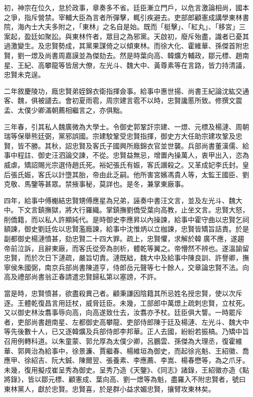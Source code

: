 \begin{pinyinscope}
初，神宗在位久，怠於政事，章奏多不省。廷臣漸立門戶，以危言激論相尚，國本之爭，指斥營禁。宰輔大臣為言者所彈擊，輒引疾避去。吏部郎顧憲成講學東林書院，海內士大夫多附之，「東林」之名自是始。既而「梃擊」、「紅丸」、「移宮」三案起，盈廷如聚訟。與東林忤者，眾目之為邪黨。天啟初，廢斥殆盡，識者已憂其過激變生。及忠賢勢成，其黨果謀倚之以傾東林。而徐大化、霍維華、孫傑首附忠賢，劉一燝及尚書周嘉謨並為傑劾去。然是時葉向高、韓爌方輔政，鄒元標、趙南星、王紀、高攀龍等皆居大僚，左光斗、魏大中、黃尊素等在言路，皆力持清議，忠賢未克逞。

二年敘慶陵功，廕忠賢弟姪錦衣衛指揮僉事。給事中惠世揚、尚書王紀論沈紘交通客、魏，俱被譴去。會初夏雨雹，周宗建言雹不以時，忠賢讒慝所致。修撰文震孟、太僕少卿滿朝薦相繼言之，亦俱黜。

三年春，引其私人魏廣微為大學士。令御史郭鞏訐宗建、一燝、元標及楊漣、周朝瑞等保舉熊廷弼，黨邪誤國。宗建駮鞏受忠賢指揮，御史方大任助宗建攻鞏及忠賢，皆不勝。其秋，詔忠賢及客氏子國興所廕錦衣官並世襲。兵部尚書董漢儒、給事中程註、御史汪泗論交諫，不從。忠賢益無忌，增置內操萬人，衷甲出入，恣為威虐。矯詔賜光宗選侍趙氏死。裕妃張氏有娠，客氏譖殺之。又革成妃李氏封。皇后張氏娠，客氏以計墮其胎，帝由此乏嗣。他所害宮嬪馮貴人等，太監王國臣、劉克敬、馬鑒等甚眾。禁掖事秘，莫詳也。是冬，兼掌東廠事。

四年，給事中傅櫆結忠賢甥傅應星為兄弟，誣奏中書汪文言，並及左光斗、魏大中。下文言鎮撫獄，將大行羅織。掌鎮撫劉僑受葉向高教，止坐文言。忠賢大怒，削僑籍，而以私人許顯純代。是時御史李應昇以內操諫，給事中霍守曲以忠賢乞祠額諫，御史劉廷佐以忠賢濫廕諫，給事中沈惟炳以立枷諫，忠賢皆矯旨詰責。於是副都御史楊漣憤甚，劾忠賢二十四大罪。疏上，忠賢懼，求解於韓廣不應，遂趨帝前泣訴，且辭東廠，而客氏從旁為剖析，體乾等翼之。帝懵然不辨也。遂溫諭留忠賢，而於次日下漣疏，嚴旨切責。漣既絀，魏大中及給事中陳良訓、許譽卿，撫寧侯朱國弼，南京兵部尚書陳道亨，侍郎岳元聲等七十餘人，交章論忠賢不法。向高及禮部尚書翁正春請遣忠賢歸私第以塞謗，不許。

當是時，忠賢憤甚，欲盡殺異己者。顧秉謙因陰籍其所忌姓名授忠賢，使以次斥逐。王體乾復昌言用廷杖，威脅廷臣。未幾，工部郎中萬燝上疏刺忠賢，立杖死。又以御史林汝翥事辱向高，向高遂致仕去，汝翥亦予杖。廷臣俱大讋。一時罷斥者，吏部尚書趙南星、左都御史高攀龍、吏部侍郎陳于廷及楊漣、左光斗、魏大中等先後數十人，已又逐韓爌及兵部侍郎李邦華。正人去國，紛紛若振槁。乃矯中旨召用例轉科道。以朱童蒙、郭允厚為太僕少卿，呂鵬雲、孫傑為大理丞，復霍維華、郭興治為給事中，徐景濂、賈繼春、楊維垣為御史，而起徐兆魁、王紹徽、喬應甲、徐紹吉、阮大鋮、陳爾翌、張養素、李應薦、李嵩、楊春懋等，為之爪牙。未幾，復用擬戍崔呈秀為御史。呈秀乃造《天鑒》、《同志》諸錄，王紹徽亦造《點將錄》，皆以鄒元標、顧憲成、葉向高、劉一燝等為魁，盡羅入不附忠賢者，號曰東林黨人，獻於忠賢。忠賢喜，於是群小益求媚忠賢，攘臂攻東林矣。


\end{pinyinscope}
